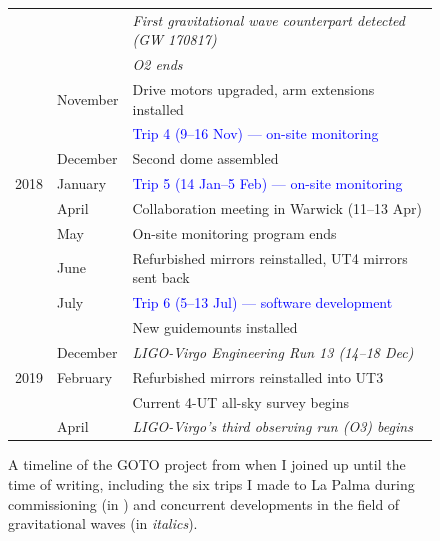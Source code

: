 \begin{colsection}
\begin{colsection}
\begin{figure}[p]
\begin{center}
\begin{tabular}{cl|@{\tls}l}
                 &           & \textit{First gravitational wave counterpart detected (GW 170817)} \\
                 &           & \textit{O2 ends} \\
                 & November  & Drive motors upgraded, arm extensions installed \\
                 &           & \textcolor{Blue}{Trip 4 (9--16 Nov) --- on-site monitoring} \\
                 & December  & Second dome assembled \\
            \midrule
            2018 & January   & \textcolor{Blue}{Trip 5 (14 Jan--5 Feb) --- on-site monitoring} \\
                 & April     & Collaboration meeting in Warwick (11--13 Apr)\\
                 & May       & On-site monitoring program ends \\
                 & June      & Refurbished mirrors reinstalled, UT4 mirrors sent back \\
                 & July      & \textcolor{Blue}{Trip 6 (5--13 Jul) --- software development} \\
                 &           & New guidemounts installed \\
                 & December  & \textit{LIGO-Virgo Engineering Run 13 (14--18 Dec)} \\
            \midrule
            2019 & February  & Refurbished mirrors reinstalled into UT3 \\
                 &           & Current 4-UT all-sky survey begins \\
                 & April     & \textit{LIGO-Virgo's third observing run (O3) begins} \\
        \end{tabular}
    \end{center}
    \caption[Timeline of the GOTO project]{
        A timeline of the GOTO project from when I joined up until the time of writing, including the six trips I made to La Palma during commissioning (in ) and concurrent developments in the field of gravitational waves (in \textit{italics}).
    }\label{tab:timeline}
\end{figure}

\clearpage


\end{colsection}
\end{colsection}
